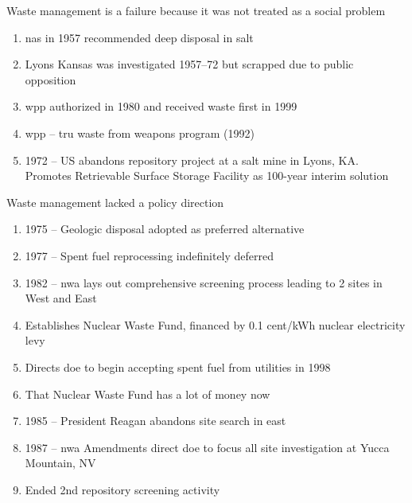 \documentclass[aspectratio=1610,pdftex,dvipsnames,compress,xcolor={dvipsnames}]{beamer}
\newcommand{\acs}{\acrshort} %
\begin{document}
\begin{frame}{Waste management is a failure because it was not treated as a social problem}
    \begin{enumerate}[series=outerlist,topsep=0pt,itemsep=21pt,leftmargin=*,label=(\arabic*)]
        \item[]\acs{nas} in 1957 recommended deep disposal in salt 
        \item[]Lyons Kansas was investigated 1957--72 but scrapped due to public opposition
        \item[]\acs{wpp} authorized in 1980 and received waste first in 1999
        \item[]\acs{wpp} -- \acs{tru} waste from weapons program (1992)
        \item[]1972 -- US abandons repository project at a salt mine in Lyons, KA. Promotes Retrievable Surface Storage Facility as 100-year interim solution
    \end{enumerate}
\end{frame}


\begin{frame}{Waste management lacked a policy direction}
    \begin{enumerate}[series=outerlist,topsep=0pt,itemsep=11pt,leftmargin=*,label=(\arabic*)]
        \item[]1975 -- Geologic disposal adopted as preferred alternative
        \item[]1977 -- Spent fuel reprocessing indefinitely deferred
        \item[]1982 -- \acs{nwa} lays out comprehensive screening process leading to 2 sites in West and East
        \item[]Establishes Nuclear Waste Fund, financed by 0.1 cent/kWh nuclear electricity levy
        \item[]Directs \acs{doe} to begin accepting spent fuel from utilities in 1998
        \item[]That Nuclear Waste Fund has a lot of money now
        \item[]1985 -- President Reagan abandons site search in east
        \item[]1987 -- \acs{nwa} Amendments direct \acs{doe} to focus all site investigation at Yucca Mountain, NV
        \item[]Ended 2nd repository screening activity
    \end{enumerate}
\end{frame}
\end{document}
